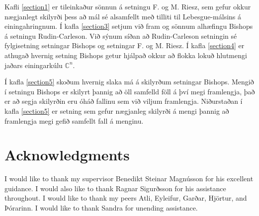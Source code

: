 \documentclass[a4paper,12pt,twoside,BCOR=10mm]{scrbook}
\theoremstyle{definition}
\theoremstyle{definition}
\theoremstyle{definition}
\begin{document}
Kafli \ref{section1} er tileinkaður sönnun á setningu F. og M. Riesz, sem gefur okkur nægjanlegt skilyrði þess að mál sé alsamfellt með tilliti til Lebesgue-málsins á einingahringnum.
Í kafla \ref{section3} setjum við fram og sönnum alhæfingu Bishops á setningu Rudin-Carleson.
Við sýnum síðan að Rudin-Carleson setningin sé fylgisetning setningar Bishops og setningar F. og M. Riesz.
Í kafla \ref{section4} er athugað hvernig setning Bishops getur hjálpað okkur að flokka lokuð hlutmengi jaðars einingarkúlu $\mathbb{C}^n$.

Í kafla \ref{section5} skoðum hvernig slaka má á skilyrðum setningar Bishops.
Mengið í setningu Bishops er skilyrt þannig að öll samfelld föll á því megi framlengja, það er að segja skilyrðin eru óháð fallinu sem við viljum framlengja.
Niðurstaðan í kafla \ref{section5} er setning sem gefur nægjanleg skilyrði á mengi þannig að framlengja megi gefið samfellt fall á menginu.
\vfill
\newpage

\tableofcontents



\chapter*{Acknowledgments}
I would like to thank my supervisor Benedikt Steinar Magnússon for his excellent guidance.
I would also like to thank Ragnar Sigurðsson for his assistance throughout.
I would like to thank my peers Atli, Eyleifur, Garðar, Hjörtur, and Þórarinn.
I would like to thank Sandra for unending assistance.

\setcounter{page}{1}
\end{document}
